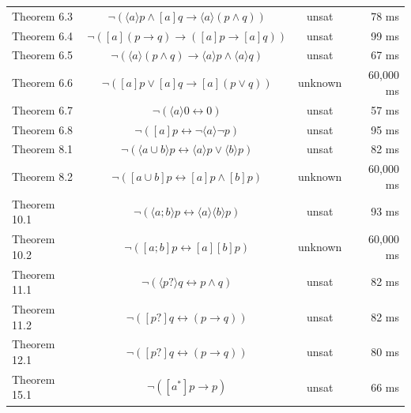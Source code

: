 \documentclass[12pt,a4paper]{article}
\begin{document}
\begin{table}[H]
\begin{tabular}{lccr}
Theorem 6.3 & $\neg ( \langle  a \rangle  p \wedge [a] q \rightarrow   \langle  a \rangle  (p \wedge q))$  & unsat & 78 ms \\
	

Theorem 6.4 & $\neg ([a](p \rightarrow  q) \rightarrow  ([a]p \rightarrow  [a] q))$  & unsat & 99 ms \\
	

Theorem 6.5 & $\neg ( \langle  a \rangle  (p \wedge q) \rightarrow   \langle  a \rangle   p \wedge  \langle  a \rangle   q)$  & unsat & 67 ms \\
	

Theorem 6.6 & $\neg ([a]p \vee [a] q \rightarrow  [a] (p \vee q))$  & unknown   & 60,000 ms \\
	

Theorem 6.7 & $\neg ( \langle  a \rangle   0  \leftrightarrow  0)$  & unsat & 57 ms \\
	

Theorem 6.8 & $\neg ([a]p  \leftrightarrow  \neg   \langle  a \rangle   \neg  p)$  & unsat & 95 ms \\
	

Theorem 8.1 & $\neg ( \langle  a \cup b \rangle   p  \leftrightarrow   \langle  a \rangle   p \vee  \langle  b \rangle   p)$  & unsat & 82 ms \\
	

Theorem 8.2 & $\neg ([a \cup b] p  \leftrightarrow  [a] p \wedge [b] p)$  & unknown   & 60,000 ms \\
	

Theorem 10.1 & $\neg ( \langle  a ; b \rangle   p  \leftrightarrow   \langle  a \rangle   \langle  b \rangle   p)$  & unsat  & 93 ms  \\
	

Theorem 10.2 & $\neg ([a ; b] p  \leftrightarrow  [a][b] p)$  & unknown   & 60,000 ms \\
	

Theorem 11.1 & $\neg ( \langle  p? \rangle   q  \leftrightarrow  p \wedge q)$  & unsat & 82 ms \\
	

Theorem 11.2 & $\neg ([p?] q  \leftrightarrow  (p \rightarrow  q))$  & unsat & 82 ms \\
	

Theorem 12.1 & $\neg ([p?] q  \leftrightarrow  (p \rightarrow  q))$  & unsat  & 80 ms \\
	

Theorem 15.1 & $\neg ([a^{*}]p \rightarrow  p)$  & unsat  & 66 ms \\
	


\end{tabular}
\end{table}
\end{document}
